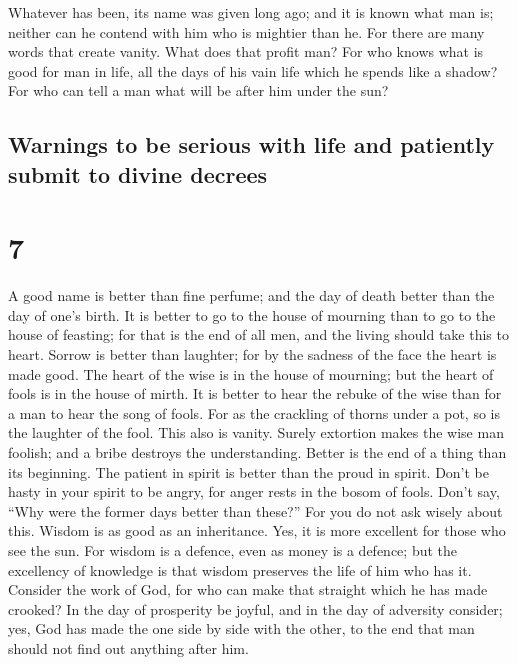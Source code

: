  Whatever has been, its name was given long ago; and it
is known what man is; neither can he contend with him who is mightier
than he.  For there are many words that create vanity.
What does that profit man?  For who knows what is good
for man in life, all the days of his vain life which he spends like a
shadow? For who can tell a man what will be after him under the sun?

\hypertarget{warnings-to-be-serious-with-life-and-patiently-submit-to-divine-decrees}{%
\subsection{Warnings to be serious with life and patiently submit to
divine
decrees}\label{warnings-to-be-serious-with-life-and-patiently-submit-to-divine-decrees}}

\hypertarget{section-6}{%
\section{7}\label{section-6}}

 A good name is better than fine perfume; and the day of
death better than the day of one's birth.  It is better to
go to the house of mourning than to go to the house of feasting; for
that is the end of all men, and the living should take this to heart.
 Sorrow is better than laughter; for by the sadness of the
face the heart is made good.  The heart of the wise is in
the house of mourning; but the heart of fools is in the house of mirth.
 It is better to hear the rebuke of the wise than for a
man to hear the song of fools.  For as the crackling of
thorns under a pot, so is the laughter of the fool. This also is vanity.
 Surely extortion makes the wise man foolish; and a bribe
destroys the understanding.  Better is the end of a thing
than its beginning. The patient in spirit is better than the proud in
spirit.  Don't be hasty in your spirit to be angry, for
anger rests in the bosom of fools.  Don't say, ``Why were
the former days better than these?'' For you do not ask wisely about
this.  Wisdom is as good as an inheritance. Yes, it is
more excellent for those who see the sun.  For wisdom is
a defence, even as money is a defence; but the excellency of knowledge
is that wisdom preserves the life of him who has it. 
Consider the work of God, for who can make that straight which he has
made crooked?  In the day of prosperity be joyful, and in
the day of adversity consider; yes, God has made the one side by side
with the other, to the end that man should not find out anything after
him.

